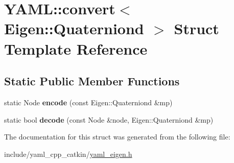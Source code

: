 \hypertarget{structYAML_1_1convert_3_01Eigen_1_1Quaterniond_01_4}{}\section{Y\+A\+ML\+:\+:convert$<$ Eigen\+:\+:Quaterniond $>$ Struct Template Reference}
\label{structYAML_1_1convert_3_01Eigen_1_1Quaterniond_01_4}
\subsection*{Static Public Member Functions}
\begin{DoxyCompactItemize}
\item 
\mbox{\label{structYAML_1_1convert_3_01Eigen_1_1Quaterniond_01_4_a85181ea20e6b7dc21b6daffa53d745ee}} 
static Node {\bfseries encode} (const Eigen\+::\+Quaterniond \&mp)
\item 
\mbox{\label{structYAML_1_1convert_3_01Eigen_1_1Quaterniond_01_4_add796e15f8e6672ada052f112cbf3f51}} 
static bool {\bfseries decode} (const Node \&node, Eigen\+::\+Quaterniond \&mp)
\end{DoxyCompactItemize}


The documentation for this struct was generated from the following file\+:\begin{DoxyCompactItemize}
\item 
include/yaml\+\_\+cpp\+\_\+catkin/\hyperlink{yaml__eigen_8h}{yaml\+\_\+eigen.\+h}\end{DoxyCompactItemize}

